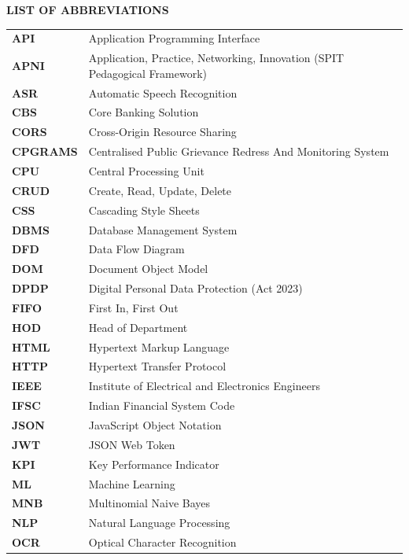 \newpage
\thispagestyle{plain}
\begin{center}
\Large\textbf{LIST OF ABBREVIATIONS}
\end{center}
\vspace{0.8cm}

\noindent
\begin{longtable}{p{3.5cm}p{11.5cm}}
\textbf{API} & Application Programming Interface \\
\textbf{APNI} & Application, Practice, Networking, Innovation (SPIT Pedagogical Framework) \\
\textbf{ASR} & Automatic Speech Recognition \\
\textbf{CBS} & Core Banking Solution \\
\textbf{CORS} & Cross-Origin Resource Sharing \\
\textbf{CPGRAMS} & Centralised Public Grievance Redress And Monitoring System \\
\textbf{CPU} & Central Processing Unit \\
\textbf{CRUD} & Create, Read, Update, Delete \\
\textbf{CSS} & Cascading Style Sheets \\
\textbf{DBMS} & Database Management System \\
\textbf{DFD} & Data Flow Diagram \\
\textbf{DOM} & Document Object Model \\
\textbf{DPDP} & Digital Personal Data Protection (Act 2023) \\
\textbf{FIFO} & First In, First Out \\
\textbf{HOD} & Head of Department \\
\textbf{HTML} & Hypertext Markup Language \\
\textbf{HTTP} & Hypertext Transfer Protocol \\
\textbf{IEEE} & Institute of Electrical and Electronics Engineers \\
\textbf{IFSC} & Indian Financial System Code \\
\textbf{JSON} & JavaScript Object Notation \\
\textbf{JWT} & JSON Web Token \\
\textbf{KPI} & Key Performance Indicator \\
\textbf{ML} & Machine Learning \\
\textbf{MNB} & Multinomial Naive Bayes \\
\textbf{NLP} & Natural Language Processing \\
\textbf{OCR} & Optical Character Recognition \\

\end{longtable}
